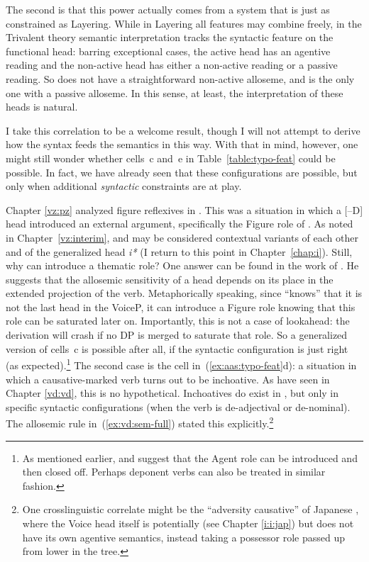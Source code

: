 \begin{exe}
\begin{xlist}
\begin{exe}
\begin{exe}
\begin{xlist}
\begin{exe}
\begin{exe}
\begin{exe}
\begin{exe}
\begin{exe}
\begin{xlist}
\label{r1:6:2}The second is that this power actually comes from a system that is just as constrained as Layering. While in Layering all features may combine freely, in the Trivalent theory semantic interpretation tracks the syntactic feature on the functional head: barring exceptional cases, the active head {\vd} has an agentive reading and the non-active head {\vz} has either a non-active reading or a passive reading. So {\vd} does not have a straightforward non-active alloseme, and {\vz} is the only one with a passive alloseme. In this sense, at least, the interpretation of these heads is natural.

I take this correlation to be a welcome result, though I will not attempt to derive how the syntax feeds the semantics in this way. With that in mind, however, one might still wonder whether cells~c and~e in Table~\ref{table:typo-feat} could be possible. In fact, we have already seen that these configurations are possible, but only when additional \emph{syntactic} constraints are at play.

Chapter \ref{vz:pz} analyzed figure reflexives in {\tnif}. This was a situation in which a [--D] head introduced an external argument, specifically the Figure role of {\pz}. As noted in Chapter~\ref{vz:interim}, {\pz} and {\vz} may be considered contextual variants of each other and of the generalized head \emph{i*} (I return to this point in Chapter~\ref{chap:i}). Still, why can {\pz} introduce a thematic role? One answer can be found in the work of \cite{wood15springer}. He suggests that the allosemic sensitivity of a head depends on its place in the extended projection of the verb. Metaphorically speaking, since {\pz} ``knows'' that it is not the last head in the VoiceP, it can introduce a Figure role knowing that this role can be saturated later on. Importantly, this is not a case of lookahead: the derivation will crash if no DP is merged to saturate that role. So a generalized version of cells~c is possible after all, if the syntactic configuration is just right (as expected).\footnote{As mentioned earlier, \cite{legate14} and \cite{akkus19jl} suggest that the Agent role can be introduced and then closed off. Perhaps deponent verbs can also be treated in similar fashion.}
The second case is the cell in~(\ref{ex:aas:typo-feat}d): a situation in which a causative-marked verb turns out to be inchoative. As have seen in Chapter \ref{vd:vd}, this is no hypothetical. Inchoatives do exist in {\thif}, but only in specific syntactic configurations (when the verb is de-adjectival or de-nominal). The allosemic rule in~(\ref{ex:vd:sem-full}) stated this explicitly.\footnote{One crosslinguistic correlate might be the ``adversity causative'' of Japanese \citep{pylkkanen08,woodmarantz17}, where the Voice head itself is potentially {\vd} (see Chapter \ref{i:i:jap}) but does not have its own agentive semantics, instead taking a possessor role passed up from lower in the tree.}


\end{xlist}
\end{exe}
\end{exe}
\end{exe}
\end{exe}
\end{exe}
\end{xlist}
\end{exe}
\end{exe}
\end{xlist}
\end{exe}
